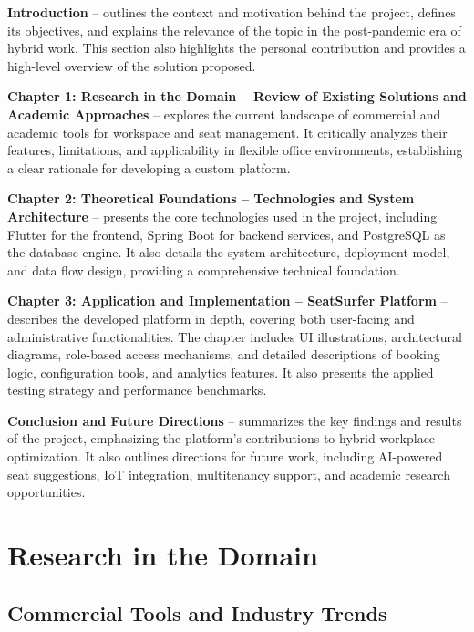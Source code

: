 \documentclass[12pt,a4paper]{report} %
\begin{document}
\textbf{Introduction} – outlines the context and motivation behind the project, defines its objectives, and explains the relevance of the topic in the post-pandemic era of hybrid work. This section also highlights the personal contribution and provides a high-level overview of the solution proposed.

\textbf{Chapter 1: Research in the Domain – Review of Existing Solutions and Academic Approaches} – explores the current landscape of commercial and academic tools for workspace and seat management. It critically analyzes their features, limitations, and applicability in flexible office environments, establishing a clear rationale for developing a custom platform.

\textbf{Chapter 2: Theoretical Foundations – Technologies and System Architecture} – presents the core technologies used in the project, including Flutter for the frontend, Spring Boot for backend services, and PostgreSQL as the database engine. It also details the system architecture, deployment model, and data flow design, providing a comprehensive technical foundation.

\textbf{Chapter 3: Application and Implementation – SeatSurfer Platform} – describes the developed platform in depth, covering both user-facing and administrative functionalities. The chapter includes UI illustrations, architectural diagrams, role-based access mechanisms, and detailed descriptions of booking logic, configuration tools, and analytics features. It also presents the applied testing strategy and performance benchmarks.

\textbf{Conclusion and Future Directions} – summarizes the key findings and results of the project, emphasizing the platform's contributions to hybrid workplace optimization. It also outlines directions for future work, including AI-powered seat suggestions, IoT integration, multitenancy support, and academic research opportunities.

\newpage

\chapter{Research in the Domain}

\section{Commercial Tools and Industry Trends}
\end{document}
